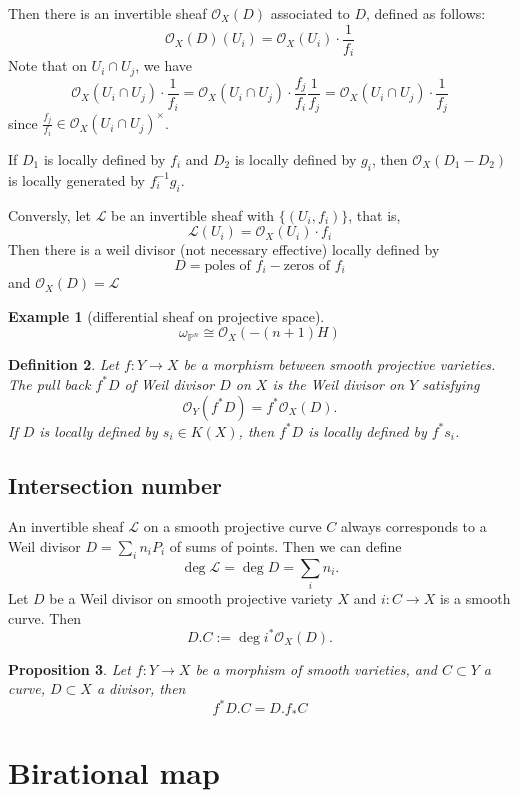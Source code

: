 \documentclass{article}
\newtheorem{defn}{Definition}[section]
\newtheorem{prop}[defn]{Proposition}
\newtheorem{exa}[defn]{Example}
\begin{document}
Then there is an invertible sheaf $\mathcal{O}_{X}(D)$ associated to $D$, defined as follows:
\[
	\mathcal{O}_{X}(D)(U_{i})=\mathcal{O}_{X}(U_{i})\cdot \frac{1}{f_{i}}
\]
Note that on $U_{i} \cap U_{j}$, we have
\[
	\mathcal{O}_{X}(U_{i} \cap U_{j})\cdot\frac{1}{f_{i}}=\mathcal{O}_{X}(U_{i} \cap U_{j})\cdot \frac{f_{j}}{f_{i}}\frac{1}{f_{j}}=\mathcal{O}_{X}(U_{i} \cap U_{j})\cdot\frac{1}{f_{j}}
\]
since $ \frac{f_{j}}{f_{i}}\in \mathcal{O}_{X}(U_{i} \cap U_{j})^{\times}$.

If $D_{1}$ is locally defined by $f_{i}$ and $D_{2}$ is locally defined by $g_{i}$, then $\mathcal{O}_{X}(D_1 - D_2)$ is locally generated by $f_i^{-1}g_i$.

Conversly, let $\mathcal{L}$ be an invertible sheaf with $\{(U_{i},f_{i})\} $, that is,
\[
	\mathcal{L}(U_{i})=\mathcal{O}_{X}(U_{i})\cdot f_{i}
\]
Then there is a weil divisor  (not necessary effective) locally defined by
\[
	D=\text{poles of }f_{i}-\text{zeros of }f_{i}
\]
and $\mathcal{O}_{X}(D)=\mathcal{L}$


\begin{exa}[differential sheaf on projective space]
	\[
		\omega_{\mathbb{P}^{n}}\cong \mathcal{O}_{X}(-(n+1)H)
	\]
\end{exa}
\begin{defn}
	Let $f:Y\to X$ be a morphism between smooth projective varieties. The pull back $f^*D$ of Weil divisor $D$ on $X$ is the Weil divisor on $Y$ satisfying
	\[
		\mathcal{O}_{Y}(f^*D)=f^*\mathcal{O}_{X}(D).
	\]
	If $D$ is locally defined by $s_{i}\in K(X)$, then $f^*D$ is locally defined by $f^*s_{i}$.
\end{defn}
\subsection{Intersection number}
An invertible sheaf $\mathcal{L}$ on a smooth projective curve $C$ always corresponds to a Weil divisor $D=\sum_{i}n_{i}P_{i}$ of sums of points. Then we can define
\[
	\deg \mathcal{L}=\deg D=\sum_{i}n_{i}.
\]
Let $D$ be a Weil divisor on smooth projective variety $X$ and $i:C\to X$ is a smooth curve. Then
\[
	D.C:=\deg i^*\mathcal{O}_{X}(D).
\]


\begin{prop}
	Let $f:Y\to X$ be a morphism of smooth varieties, and $ C\subset Y$ a curve, $D\subset X$ a divisor, then
	\[
		f^*D.C=D.f_*C
	\]

\end{prop}
\section{Birational map}
\end{document}
